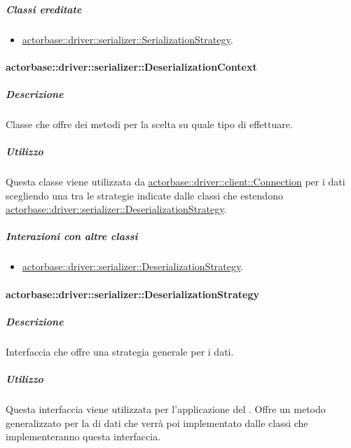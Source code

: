 \documentclass{scalatekids-article}
\begin{document}
\subparagraph{Classi ereditate}

\begin{itemize}

\item \hyperref[sec:actorbase::driver::serializer::SerializationStrategy]{actorbase::driver::serializer::SerializationStrategy}.

\end{itemize}

\paragraph{actorbase::driver::serializer::DeserializationContext}
\label{sec:actorbase::driver::serializer::DeserializationContext}

\subparagraph{Descrizione}

Classe che offre dei metodi per la scelta su quale tipo di 
effettuare.

\subparagraph{Utilizzo}

Questa classe viene utilizzata da \hyperref[sec:actorbase::driver::client::Connection]{actorbase::driver::client::Connection}
per  i dati scegliendo una tra le strategie indicate
dalle classi che estendono \hyperref[sec:actorbase::driver::serializer::DeserializationStrategy]{actorbase::driver::serializer::DeserializationStrategy}.

\subparagraph{Interazioni con altre classi}

\begin{itemize}

\item \hyperref[sec:actorbase::driver::serializer::DeserializationStrategy]{actorbase::driver::serializer::DeserializationStrategy}.

\end{itemize}

\paragraph{actorbase::driver::serializer::DeserializationStrategy}
\label{sec:actorbase::driver::serializer::DeserializationStrategy}

\subparagraph{Descrizione}

Interfaccia che offre una strategia generale per  i dati.

\subparagraph{Utilizzo}

Questa interfaccia viene utilizzata per l'applicazione del 
. Offre un metodo generalizzato per la
 di dati che verrà poi implementato dalle classi che
implementeranno questa interfaccia.
\end{document}
